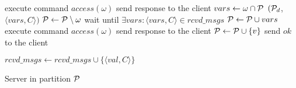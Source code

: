\begin{algorithm}[t!]
\small

\begin{distribalgo}[1]

		\STATE execute command $access(\omega)$
		\STATE send response to the client
\ENDINDENT
\vspace{1.0mm}
			\STATE $vars \leftarrow \omega \cap \mathcal{P}$
			\STATE \rmcast$(\mathcal{P}_d$,$\langle vars, C \rangle)$
			\STATE $\mathcal{P} \leftarrow \mathcal{P} \setminus \omega$
			\STATE wait until $\exists vars : \langle vars, C \rangle \in rcvd\_msgs$
				\STATE $\mathcal{P} \leftarrow \mathcal{P} \cup vars$
				\STATE execute command $access(\omega)$
				\STATE send response to the client
		\ENDIF
	\ENDINDENT
	\vspace{1.0mm}
		\STATE $\mathcal{P} \leftarrow \mathcal{P} \cup \{v\}$
		\STATE send $ok$ to the client
	\ENDINDENT

  \vspace{1.0mm}

      \STATE $rcvd\_msgs \leftarrow rcvd\_msgs \cup \{\langle val, C \rangle\}$
  \ENDINDENT


\caption{Server in partition $\mathcal{P}$}
\label{alg:server_proxy}
\end{distribalgo}
\end{algorithm}